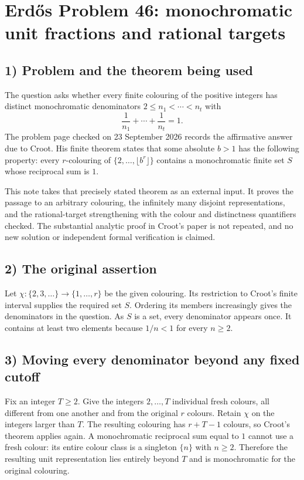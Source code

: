 \section{Erd\H{o}s Problem 46: monochromatic unit fractions and rational targets}

\subsection{1) Problem and the theorem being used}
The question asks whether every finite colouring of the positive
integers has distinct monochromatic denominators
$2\leq n_1<\cdots<n_t$ with
\[
 \frac1{n_1}+\cdots+\frac1{n_t}=1.
\]
The problem page checked on 23 September 2026 records the affirmative
answer due to Croot. His finite theorem states that some absolute
$b>1$ has the following property: every $r$-colouring of
$\{2,\ldots,\lfloor b^r\rfloor\}$ contains a monochromatic finite
set $S$ whose reciprocal sum is $1$.

This note takes that precisely stated theorem as an external input.
It proves the passage to an arbitrary colouring, the infinitely many
disjoint representations, and the rational-target strengthening with
the colour and distinctness quantifiers checked. The substantial
analytic proof in Croot's paper is not repeated, and no new solution
or independent formal verification is claimed.

\subsection{2) The original assertion}
Let $\chi:\{2,3,\ldots\}\to\{1,\ldots,r\}$ be the given colouring.
Its restriction to Croot's finite interval supplies the required set
$S$. Ordering its members increasingly gives the denominators in the
question. As $S$ is a set, every denominator appears once. It contains
at least two elements because $1/n<1$ for every $n\geq2$.

\subsection{3) Moving every denominator beyond any fixed cutoff}
Fix an integer $T\geq2$. Give the integers $2,\ldots,T$ individual
fresh colours, all different from one another and from the original
$r$ colours. Retain $\chi$ on the integers larger than $T$.
The resulting colouring has $r+T-1$ colours, so Croot's theorem applies
again. A monochromatic reciprocal sum equal to $1$ cannot use a fresh
colour: its entire colour class is a singleton $\{n\}$ with $n\geq2$.
Therefore the resulting unit representation lies entirely beyond $T$
and is monochromatic for the original colouring.

